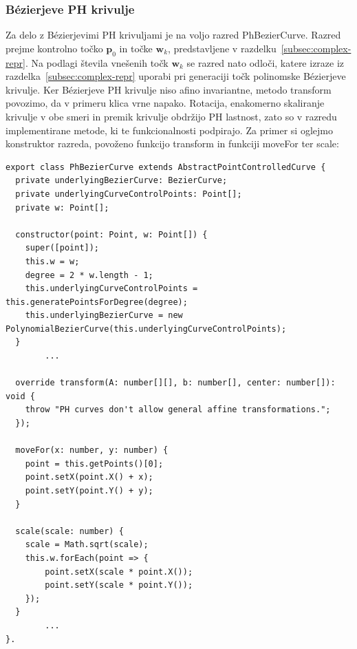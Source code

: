 \documentclass[isrm2, tisk]{fmfdelo}
\newcommand{\p}{\mathbf{p}}
\begin{document}
    \subsubsection*{Bézierjeve PH krivulje}
    Za delo z Bézierjevimi PH krivuljami je na voljo razred PhBezierCurve.
    Razred prejme kontrolno točko $\p_0$ in točke $\mathbf{w}_k$, predstavljene v razdelku~\ref{subsec:complex-repr}.
    Na podlagi števila vnešenih točk $\mathbf{w}_k$ se razred nato odloči, katere izraze iz razdelka~\ref{subsec:complex-repr} uporabi pri generaciji točk polinomske Bézierjeve krivulje.
    Ker Bézierjeve PH krivulje niso afino invariantne, metodo transform povozimo, da v primeru klica vrne napako.
    Rotacija, enakomerno skaliranje krivulje v obe smeri in premik krivulje obdržijo PH lastnost, zato so v razredu implementirane metode, ki te funkcionalnosti podpirajo.
    Za primer si oglejmo konstruktor razreda, povoženo funkcijo transform in funkciji moveFor ter scale:
    \begin{lstlisting}
export class PhBezierCurve extends AbstractPointControlledCurve {
  private underlyingBezierCurve: BezierCurve;
  private underlyingCurveControlPoints: Point[];
  private w: Point[];

  constructor(point: Point, w: Point[]) {
    super([point]);
    this.w = w;
    degree = 2 * w.length - 1;
    this.underlyingCurveControlPoints = this.generatePointsForDegree(degree);
    this.underlyingBezierCurve = new PolynomialBezierCurve(this.underlyingCurveControlPoints);
  }
        ...

  override transform(A: number[][], b: number[], center: number[]): void {
    throw "PH curves don't allow general affine transformations.";
  });

  moveFor(x: number, y: number) {
    point = this.getPoints()[0];
    point.setX(point.X() + x);
    point.setY(point.Y() + y);
  }

  scale(scale: number) {
    scale = Math.sqrt(scale);
    this.w.forEach(point => {
        point.setX(scale * point.X());
        point.setY(scale * point.Y());
    });
  }
        ...
}.
    \end{lstlisting}
\end{document}
